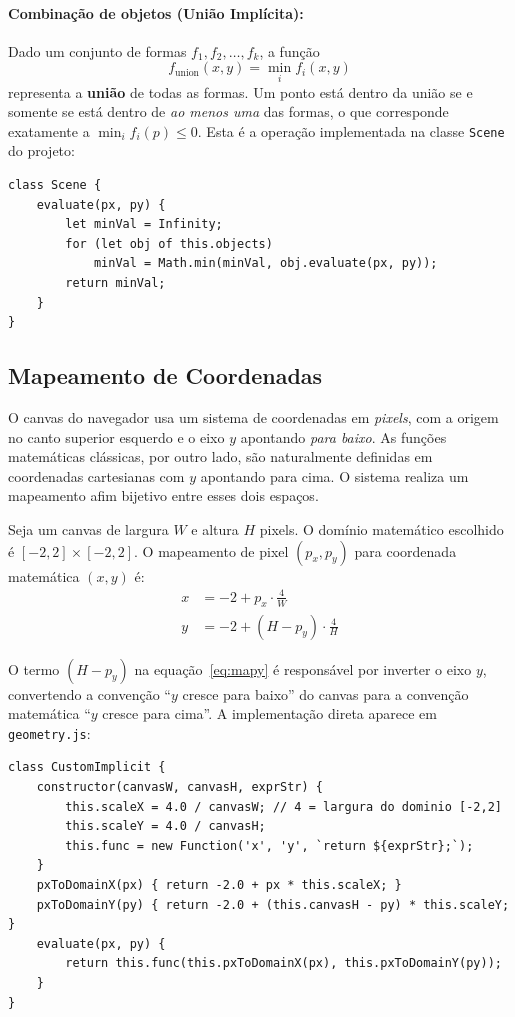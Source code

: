 \documentclass[11pt,a4paper]{article}
\theoremstyle{plain}
\theoremstyle{definition}
\begin{document}
\paragraph{Combinação de objetos (União Implícita):}
Dado um conjunto de formas $f_1, f_2, \ldots, f_k$, a função
\[
    f_{\text{union}}(x, y) = \min_i f_i(x, y)
\]
representa a \textbf{união} de todas as formas. Um ponto está dentro da união se
e somente se está dentro de \emph{ao menos uma} das formas, o que corresponde
exatamente a $\min_i f_i(p) \leq 0$. Esta é a operação implementada na classe
\texttt{Scene} do projeto:

\begin{lstlisting}
class Scene {
    evaluate(px, py) {
        let minVal = Infinity;
        for (let obj of this.objects)
            minVal = Math.min(minVal, obj.evaluate(px, py));
        return minVal;
    }
}
\end{lstlisting}

\subsection{Mapeamento de Coordenadas}
\label{subsec:coords}

O canvas do navegador usa um sistema de coordenadas em \emph{pixels}, com a
origem no canto superior esquerdo e o eixo $y$ apontando \emph{para baixo}. As
funções matemáticas clássicas, por outro lado, são naturalmente definidas em
coordenadas cartesianas com $y$ apontando para cima. O sistema realiza um
mapeamento afim bijetivo entre esses dois espaços.

Seja um canvas de largura $W$ e altura $H$ pixels. O domínio matemático escolhido
é $[-2, 2] \times [-2, 2]$. O mapeamento de pixel $(p_x, p_y)$ para coordenada
matemática $(x, y)$ é:
\begin{align}
    x &= -2 + p_x \cdot \frac{4}{W} \label{eq:mapx} \\
    y &= -2 + (H - p_y) \cdot \frac{4}{H} \label{eq:mapy}
\end{align}

O termo $(H - p_y)$ na equação~\eqref{eq:mapy} é responsável por inverter o eixo
$y$, convertendo a convenção ``$y$ cresce para baixo'' do canvas para a convenção
matemática ``$y$ cresce para cima''. A implementação direta aparece em
\texttt{geometry.js}:

\begin{lstlisting}
class CustomImplicit {
    constructor(canvasW, canvasH, exprStr) {
        this.scaleX = 4.0 / canvasW; // 4 = largura do dominio [-2,2]
        this.scaleY = 4.0 / canvasH;
        this.func = new Function('x', 'y', `return ${exprStr};`);
    }
    pxToDomainX(px) { return -2.0 + px * this.scaleX; }
    pxToDomainY(py) { return -2.0 + (this.canvasH - py) * this.scaleY; }
    evaluate(px, py) {
        return this.func(this.pxToDomainX(px), this.pxToDomainY(py));
    }
}
\end{lstlisting}
\end{document}
